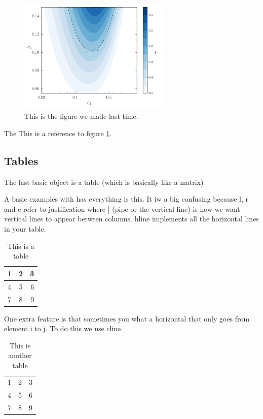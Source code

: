 \documentclass[11pt]{article}
\numberwithin{equation}{section}
\begin{document}
\begin{figure}[h!]
\begin{center}
\includegraphics[width=0.65\textwidth]{rcs}
\caption{This is the figure we made last time. }
\label{figurename}
\end{center}
\end{figure}
The This is a reference to figure \ref{figurename}.

\subsection{Tables}

The last basic object is a table (which is basically like a matrix)

A basic examples with has everything is this.  It iw a big confusing because l, r and c refer to justification where | (pipe or the vertical line) is how we want vertical lines to appear between columns.  hline implements all the horizontal lines in your table. 

\begin{table}[h!]
\begin{center}
  \begin{tabular}{ | l || c ||| r  |}
    \hline
    1 & 2 & 3 \\ \hline
    4 & 5 & 6 \\ \hline \hline
    7 & 8 & 9 \\
    \hline
  \end{tabular}
\end{center}
\caption{This is a table}\label{tablename1}
\end{table}
One extra feature is that sometimes you what a horizontal that only goes from element i to j.  To do this we use cline 
\begin{table}[h!]
\begin{center}
  \begin{tabular}{ | l | c  r  |}
    \hline
    1 & 2 & 3 \\ \cline{2-3}
    4 & 5 & 6 \\ \hline 
      7 & 8 & 9 \\
    \hline
  \end{tabular}
  \
\end{center}
\caption{This is another table}\label{tablename2}
\end{table}
\end{document}
